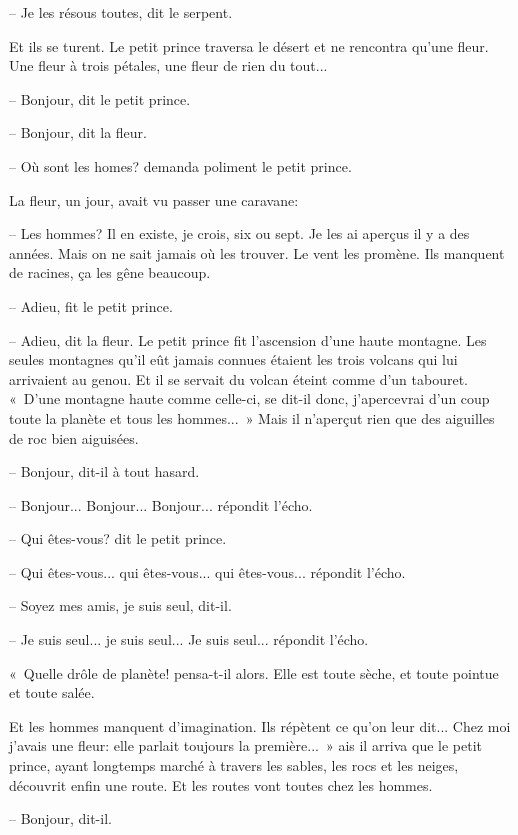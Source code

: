 \documentclass[a4paper]{report}
\begin{document}
-- Je les résous toutes, dit le serpent.

Et ils se turent.
\parachapter{} %
Le petit prince traversa le désert et ne rencontra qu'une fleur. Une fleur à trois pétales, une fleur de rien du tout...


-- Bonjour, dit le petit prince.

-- Bonjour, dit la fleur.

-- Où sont les homes? demanda poliment le petit prince.

La fleur, un jour, avait vu passer une caravane:

-- Les hommes? Il en existe, je crois, six ou sept. Je les ai aperçus il y a des années. Mais on ne sait jamais où les trouver. Le vent les promène. Ils manquent de racines, ça les gêne beaucoup.

-- Adieu, fit le petit prince.

-- Adieu, dit la fleur.
\parachapter{} %
Le petit prince fit l'ascension d'une haute montagne. Les seules montagnes qu'il eût jamais connues étaient les trois volcans qui lui arrivaient au genou. Et il se servait du volcan éteint comme d'un tabouret. «~D'une montagne haute comme celle-ci, se dit-il donc, j'apercevrai d'un coup toute la planète et tous les hommes...~» Mais il n'aperçut rien que des aiguilles de roc bien aiguisées.


-- Bonjour, dit-il à tout hasard.

-- Bonjour... Bonjour... Bonjour... répondit l'écho.

-- Qui êtes-vous? dit le petit prince.

-- Qui êtes-vous... qui êtes-vous... qui êtes-vous... répondit l'écho.

-- Soyez mes amis, je suis seul, dit-il.

-- Je suis seul... je suis seul... Je suis seul... répondit l'écho.

«~Quelle drôle de planète! pensa-t-il alors. Elle est toute sèche, et toute pointue et toute salée.

Et les hommes manquent d'imagination. Ils répètent ce qu'on leur dit... Chez moi j'avais une fleur: elle parlait toujours la première...~»
\parachapter{} %
ais il arriva que le petit prince, ayant longtemps marché à travers les sables, les rocs et les neiges, découvrit enfin une route. Et les routes vont toutes chez les hommes.

-- Bonjour, dit-il.
\end{document}
